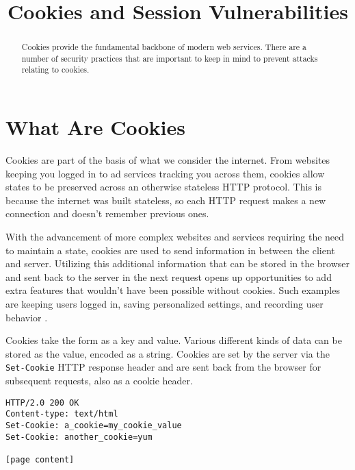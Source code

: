 \documentclass[conference,12pt]{IEEEtran}
\begin{document}
\title{Cookies and Session Vulnerabilities}

\author{
\and
{}
}

\maketitle

\begin{abstract}
Cookies provide the fundamental backbone of modern web services.  There are a
number of security practices that are important to keep in mind to prevent
attacks relating to cookies.
\end{abstract}

\section{What Are Cookies}

Cookies are part of the basis of what we consider the internet.  From websites
keeping you logged in to ad services tracking you across them, cookies allow
states to be preserved across an otherwise stateless HTTP protocol.  This is
because the internet was built stateless, so each HTTP request makes a new
connection and doesn’t remember previous ones.  

With the advancement of more complex websites and services requiring the need to
maintain a state, cookies are used to send information in between the client and
server.  Utilizing this additional information that can be stored in the browser
and sent back to the server in the next request opens up opportunities to add
extra features that wouldn’t have been possible without cookies.  Such examples
are keeping users logged in, saving personalized settings, and recording user
behavior \cite{b1}.

Cookies take the form as a key and value.  Various different kinds of data can
be stored as the value, encoded as a string.  Cookies are set by the server via
the \lstinline{Set-Cookie} HTTP response header and are sent back from the
browser for subsequent requests, also as a cookie header.

\begin{lstlisting}[caption={Server response to set a cookie}]
HTTP/2.0 200 OK
Content-type: text/html
Set-Cookie: a_cookie=my_cookie_value
Set-Cookie: another_cookie=yum

[page content]
\end{lstlisting}
\end{document}
